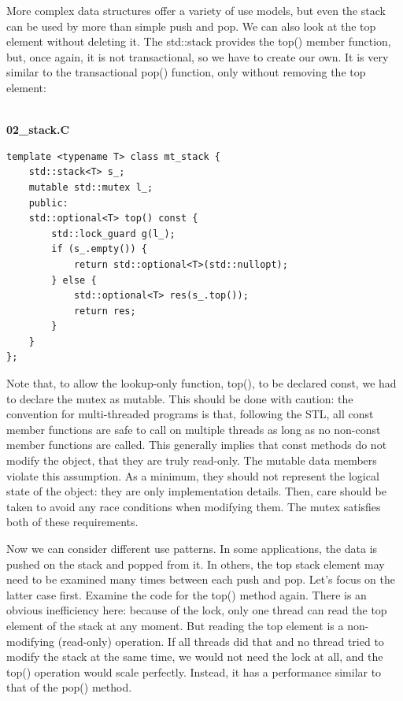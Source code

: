 More complex data structures offer a variety of use models, but even the stack can be used by more than simple push and pop. We can also look at the top element without deleting it. The std::stack provides the top() member function, but, once again, it is not transactional, so we have to create our own. It is very similar to the transactional pop() function, only without removing the top element:

\hspace*{\fill} \\ %
\noindent
\textbf{02\_stack.C}
\begin{lstlisting}[style=styleCXX]
template <typename T> class mt_stack {
	std::stack<T> s_;
	mutable std::mutex l_;
	public:
	std::optional<T> top() const {
		std::lock_guard g(l_);
		if (s_.empty()) {
			return std::optional<T>(std::nullopt);
		} else {
			std::optional<T> res(s_.top());
			return res;
		}
	}
};
\end{lstlisting}

Note that, to allow the lookup-only function, top(), to be declared const, we had to declare the mutex as mutable. This should be done with caution: the convention for multi-threaded programs is that, following the STL, all const member functions are safe to call on multiple threads as long as no non-const member functions are called. This generally implies that const methods do not modify the object, that they are truly read-only. The mutable data members violate this assumption. As a minimum, they should not represent the logical state of the object: they are only implementation details. Then, care should be taken to avoid any race conditions when modifying them. The mutex satisfies both of these requirements.

Now we can consider different use patterns. In some applications, the data is pushed on the stack and popped from it. In others, the top stack element may need to be examined many times between each push and pop. Let's focus on the latter case first. Examine the code for the top() method again. There is an obvious inefficiency here: because of the lock, only one thread can read the top element of the stack at any moment. But reading the top element is a non-modifying (read-only) operation. If all threads did that and no thread tried to modify the stack at the same time, we would not need the lock at all, and the top() operation would scale perfectly. Instead, it has a performance similar to that of the pop() method.

